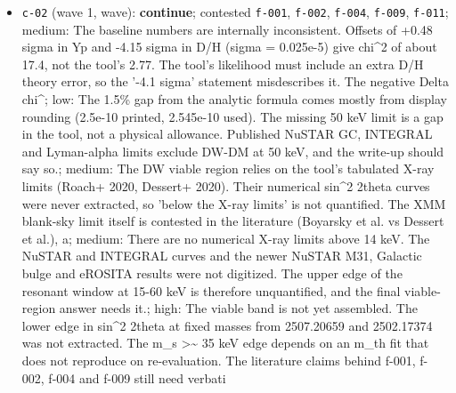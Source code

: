 \documentclass[11pt,a4paper]{article}
\begin{document}
\begin{itemize}
  \item \texttt{c-02} (wave 1, wave): \textbf{continue}; contested \texttt{f-001}, \texttt{f-002}, \texttt{f-004}, \texttt{f-009}, \texttt{f-011}; medium: The baseline numbers are internally inconsistent. Offsets of +0.48 sigma in Yp and -4.15 sigma in D/H (sigma = 0.025e-5) give chi\textasciicircum{}2 of about 17.4, not the tool's 2.77. The tool's likelihood must include an extra D/H theory error, so the '-4.1 sigma' statement misdescribes it. The negative Delta chi\textasciicircum{}; low: The 1.5\% gap from the analytic formula comes mostly from display rounding (2.5e-10 printed, 2.545e-10 used). The missing 50 keV limit is a gap in the tool, not a physical allowance. Published NuSTAR GC, INTEGRAL and Lyman-alpha limits exclude DW-DM at 50 keV, and the write-up should say so.; medium: The DW viable region relies on the tool's tabulated X-ray limits (Roach+ 2020, Dessert+ 2020). Their numerical sin\textasciicircum{}2 2theta curves were never extracted, so 'below the X-ray limits' is not quantified. The XMM blank-sky limit itself is contested in the literature (Boyarsky et al. vs Dessert et al.), a; medium: There are no numerical X-ray limits above 14 keV. The NuSTAR and INTEGRAL curves and the newer NuSTAR M31, Galactic bulge and eROSITA results were not digitized. The upper edge of the resonant window at 15-60 keV is therefore unquantified, and the final viable-region answer needs it.; high: The viable band is not yet assembled. The lower edge in sin\textasciicircum{}2 2theta at fixed masses from 2507.20659 and 2502.17374 was not extracted. The m\_s \textgreater{}\textasciitilde{} 35 keV edge depends on an m\_th fit that does not reproduce on re-evaluation. The literature claims behind f-001, f-002, f-004 and f-009 still need verbati

\end{itemize}
\end{document}
